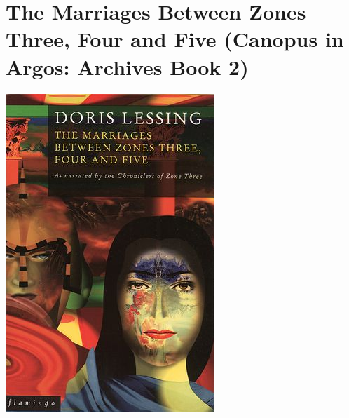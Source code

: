 \documentclass{tufte-handout}
\makeatletter
\newcommand{\varcaption}[2][0pt]{%
  \gsetlength{\@tufte@caption@vertical@offset}{-#1}%
  \gdef\@tufte@stored@varcaption{#2}%
}
\gdef\@tufte@stored@varcaption{} %
\makeatother
\begin{document}
\section*{The Marriages Between Zones Three, Four and Five (Canopus in Argos: Archives Book 2)}
\begin{marginfigure}[15\baselineskip]
   \includegraphics[width=\linewidth]{images/marriages_between_zones_three.jpg}
   \varcaption{\href{https://www.harpercollins.co.uk/9780007404223/the-marriages-between-zones-3-4-and-5-canopus-in-argos-archives-series-book-2/}{Publisher Link}, \href{https://www.amazon.com/Marriages-Between-Zones-Three-Four/dp/0006547206/}{Amazon Link}}
\end{marginfigure}
\end{document}
